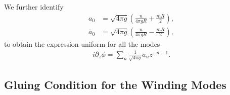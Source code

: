 We further identify
\begin{equation}
\begin{aligned}
  a_0 &= \sqrt{ 4 \pi g } \left( \frac{n}{4\pi g R} + \frac{m R }{2} \right), \\
   \bar{a}_0 &= \sqrt{ 4 \pi g } \left( \frac{n}{4\pi g R} - \frac{m R }{2} \right),
  \end{aligned}
\end{equation}
to obtain the expression uniform for all the modes
\begin{equation}
\begin{aligned}
i \partial_z \phi =  \sum_n \frac{1}{\sqrt{4\pi g}} a_n z^{-n-1} .
\end{aligned}
\end{equation}

\subsection{Gluing Condition for the Winding Modes}
\label{app_sub:compact_gluing_boundary}


